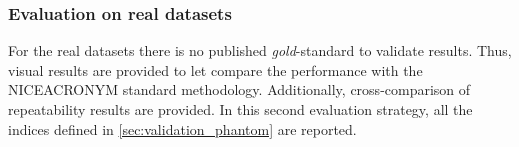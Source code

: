 \subsubsection{Evaluation on real datasets}
For the real datasets there is no published \emph{gold}-standard to validate results.
Thus, visual results are provided to let compare the performance with the NICEACRONYM
standard methodology. Additionally, cross-comparison of repeatability results are 
provided. In this second evaluation strategy, all the indices defined in 
\autoref{sec:validation_phantom} are reported.
